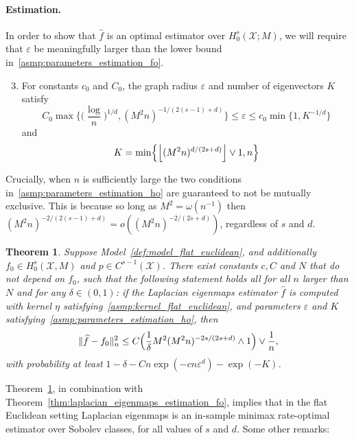 \documentclass{article}
\newcommand{\floor}[1]{\left\lfloor #1 \right\rfloor}
\newcommand{\1}{\mathbf{1}}
\newcommand{\mc}[1]{\mathcal{#1}}
\newcommand{\wh}[1]{\widehat{#1}}
\theoremstyle{alden}
\theoremstyle{aldenthm}
\newtheorem{theorem}{Theorem}
\theoremstyle{definition}
\theoremstyle{remark}
\begin{document}
\paragraph{Estimation.}
In order to show that $\wh{f}$ is an optimal estimator over $H_0^s(\mc{X};M)$, we will require that $\varepsilon$ be meaningfully larger than the lower bound in~\ref{asmp:parameters_estimation_fo}.
\begin{enumerate}[label=(P\arabic*)]
	\setcounter{enumi}{2}
	\item 
	\label{asmp:parameters_estimation_ho}
	For constants $c_0$ and $C_0$, the graph radius $\varepsilon$ and number of eigenvectors $K$ satisfy
	\begin{equation}
	\label{eqn:radius_ho}
	C_0\max\biggl\{\biggl(\frac{\log}{n}\biggr)^{1/d}, (M^2n)^{-1/(2(s - 1) + d)}\biggr\} \leq \varepsilon \leq c_0\min\{1, K^{-1/d}\}
	\end{equation}
	and
	\begin{equation*}
	K = \min\Bigl\{\floor{(M^2n)^{d/(2s + d)}} \vee 1,n\Bigr\}
	\end{equation*}
\end{enumerate}
Crucially, when $n$ is sufficiently large the two conditions in~\ref{asmp:parameters_estimation_ho} are guaranteed to not be mutually exclusive. This is because so long as $M^2 = \omega(n^{-1})$ then $(M^2n)^{-2/(2(s - 1) + d)} = o((M^2n)^{-2/(2s + d)})$, regardless of $s$ and $d$.
\begin{theorem}
	\label{thm:laplacian_eigenmaps_estimation_ho}
	Suppose Model~\ref{def:model_flat_euclidean}, and additionally $f_0 \in H_0^s(\mc{X},M)$ and $p \in C^{s - 1}(\mc{X})$. There exist constants $c,C$ and $N$ that do not depend on $f_0$, such that the following statement holds all for all $n$ larger than $N$ and for any $\delta \in (0,1)$: if the Laplacian eigenmaps estimator $\wh{f}$ is computed with kernel $\eta$ satisfying~\ref{asmp:kernel_flat_euclidean}, and parameters $\varepsilon$ and $K$ satisfying~\ref{asmp:parameters_estimation_ho}, then
	\begin{equation}
	\label{eqn:laplacian_eigenmaps_estimation_ho}
	\|\wh{f} - f_0\|_n^2 \leq C\Bigl(\frac{1}{\delta}M^2(M^2n)^{-2s/(2s + d)} \wedge 1\Bigr) \vee \frac{1}{n},
	\end{equation}
	with probability at least $1 - \delta - Cn\exp(-cn\varepsilon^d) - \exp(-K)$.
\end{theorem}
Theorem~\ref{thm:laplacian_eigenmaps_estimation_ho}, in combination with Theorem~\ref{thm:laplacian_eigenmaps_estimation_fo}, implies that in the flat Euclidean setting Laplacian eigenmaps is an in-sample minimax rate-optimal estimator over Sobolev classes, for all values of $s$ and $d$. Some other remarks:
\end{document}
